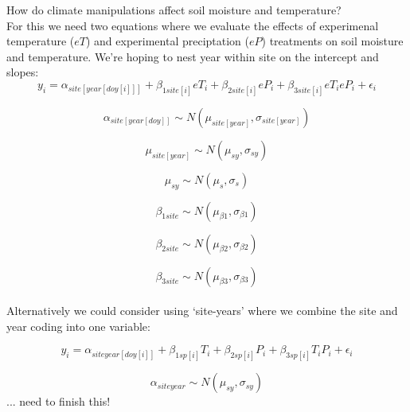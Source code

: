 \documentclass[12pt,a4paper]{article}
\begin{document}
 

 How do climate manipulations affect soil moisture and temperature?\\

\noindent For this we need two equations where we evaluate the effects of experimenal temperature ($eT$) and experimental preciptation ($eP$) treatments on soil moisture and temperature. We're hoping to nest year within site on the intercept and slopes:
\begin{equation}
y_{i}=\alpha_{site[year[doy[i]]]}+ \beta_{1 site[i]}eT_i+\beta_{2 site[i]}eP_i+\beta_{3 site[i]}eT_ieP_i+\epsilon_{i}
\end{equation}

\begin{equation}
\alpha_{site[year[doy]]}\sim N(\mu_{site[year]}, \sigma_{site[year]})
\end{equation}

\begin{equation}
\mu_{site[year]} \sim N(\mu_{sy}, \sigma_{sy})
\end{equation}

\begin{equation}
\mu_{sy} \sim N(\mu_{s}, \sigma_{s})
\end{equation}

\begin{equation}
\beta_{1 site} \sim N(\mu_{\beta1}, \sigma_{\beta1})
\end{equation}

\begin{equation}
\beta_{2 site} \sim N(\mu_{\beta2}, \sigma_{\beta2})
\end{equation}

\begin{equation}
\beta_{3 site} \sim N(\mu_{\beta3}, \sigma_{\beta3})
\end{equation}
\vspace{2ex}\\

\noindent Alternatively we could consider using `site-years' where we combine the site and year coding into one variable:

\begin{equation}
y_{i}=\alpha_{siteyear[doy[i]]}+\beta_{1 sp[i]}T_i+\beta_{2 sp[i]}P_i+\beta_{3 sp[i]}T_iP_i+\epsilon_{i}
\end{equation}

\begin{equation}
\alpha_{siteyear} \sim N(\mu_{sy}, \sigma_{sy})
\end{equation}
... need to finish this!
\vspace{2ex}\\
\end{document}
